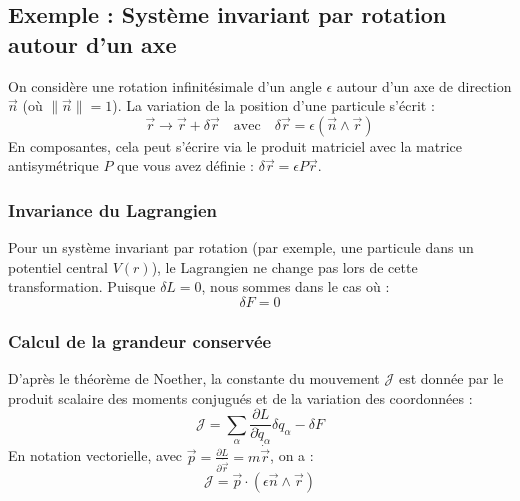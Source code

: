 \documentclass[french]{yLectureNote}
\renewcommand{\vec}{\overrightarrow}
\begin{document}






\subsection{Exemple : Système invariant par rotation autour d'un axe}

On considère une rotation infinitésimale d'un angle $\epsilon$ autour d'un axe de direction $\vec{n}$ (où $\|\vec{n}\|=1$). La variation de la position d'une particule s'écrit :
$$\vec{r} \to \vec{r} + \delta \vec{r} \quad \text{avec} \quad \delta \vec{r} = \epsilon (\vec{n} \wedge \vec{r})$$
En composantes, cela peut s'écrire via le produit matriciel avec la matrice antisymétrique $P$ que vous avez définie : $\delta \vec{r} = \epsilon P \vec{r}$.


\subsubsection{Invariance du Lagrangien}
Pour un système invariant par rotation (par exemple, une particule dans un potentiel central $V(r)$), le Lagrangien ne change pas lors de cette transformation.
Puisque $\delta L = 0$, nous sommes dans le cas où :
$$\delta F = 0$$

\subsubsection{Calcul de la grandeur conservée}
D'après le théorème de Noether, la constante du mouvement $\mathcal{J}$ est donnée par le produit scalaire des moments conjugués et de la variation des coordonnées :
$$\mathcal{J} = \sum_\alpha \frac{\partial L}{\partial \dot{q}_\alpha} \delta q_\alpha - \delta F$$
En notation vectorielle, avec $\vec{p} = \frac{\partial L}{\partial \dot{\vec{r}}} = m\dot{\vec{r}}$, on a :
$$\mathcal{J} = \vec{p} \cdot (\epsilon \vec{n} \wedge \vec{r})$$
\end{document}
